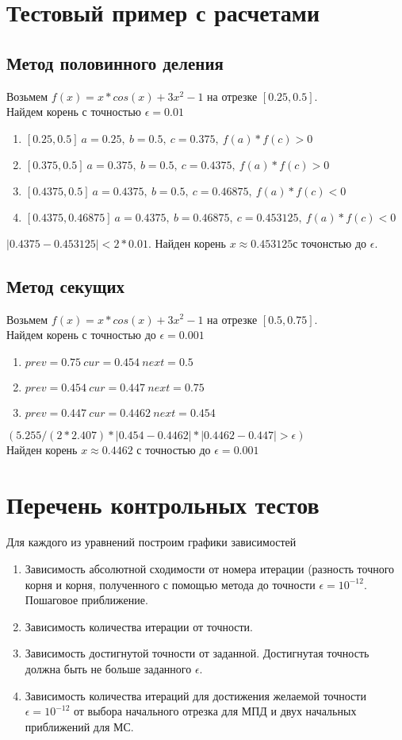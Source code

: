 \documentclass[12pt]{article}
\begin{document}
\section{Тестовый пример с расчетами}
\subsection{Метод половинного деления}
Возьмем $f(x)=x*cos(x)+3x^2-1$ на отрезке $[0.25,0.5]$. \\
Найдем корень с точностью $\epsilon=0.01$\\
\begin{enumerate}
\item $[0.25, 0.5]\ a=0.25,\ b = 0.5,\ c =0.375,\ f(a)*f(c)>0$
\item $[0.375, 0.5]\ a=0.375,\ b= 0.5,\ c =0.4375,\ f(a)*f(c)>0$
\item $[0.4375,0.5]\ a = 0.4375,\ b= 0.5,\ c = 0.46875 ,\ f(a)*f(c)<0$
\item $[0.4375,0.46875]\ a = 0.4375,\ b= 0.46875,\ c = 0.453125 ,\ f(a)*f(c)<0$\\
\end{enumerate}
$|0.4375-0.453125|<2*0.01$. Найден корень $x\approx 0.453125$с точонстью до $\epsilon$.\\
\subsection{Метод секущих}
Возьмем $f(x)=x*cos(x)+3x^2-1$ на отрезке $[0.5,0.75]$. \\
Найдем корень с точностью до $\epsilon = 0.001$\\
\begin{enumerate}
\item $prev = 0.75\ cur = 0.454\ next = 0.5 $
\item $prev = 0.454\ cur = 0.447\ next =0.75 $
\item $prev = 0.447\ cur = 0.4462\ next =0.454 $
\end{enumerate}
$(5.255 / (2 * 2.407) * |0.454 - 0.4462| * |0.4462 - 0.447| > \epsilon)$\\
Найден корень $x\approx 0.4462$ с точностью до $\epsilon = 0.001$\\
\section{Перечень контрольных тестов}
Для каждого из уравнений построим графики зависимостей 
\begin{enumerate}
    \item Зависимость абсолютной сходимости от номера итерации (разность точного корня и корня, полученного с помощью метода до точности $\epsilon = 10^{-12}$. Пошаговое приближение.\\
    \item Зависимость количества итерации от точности.
    \item Зависимость достигнутой точности от заданной. Достигнутая точность должна быть не больше заданного $\epsilon$.
    \item Зависимость количества итераций для достижения желаемой точности $\epsilon = 10^{-12}$ от выбора начального отрезка для МПД и двух начальных приближений для МС.
    \end{enumerate}
\end{document}
